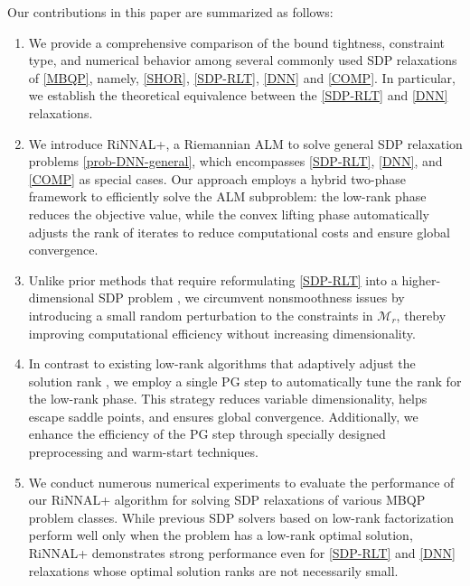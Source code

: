 \documentclass[11pt]{article}
\theoremstyle{plain}
\def\M{\mathcal{M}}
\begin{document}
Our contributions in this paper are summarized as follows:
\begin{enumerate}
    \item We provide a comprehensive comparison of the bound tightness, constraint type, and numerical behavior among several commonly used SDP relaxations of \eqref{MBQP}, namely, \eqref{SHOR}, \eqref{SDP-RLT}, \eqref{DNN} and \eqref{COMP}. In particular, we establish the theoretical equivalence between the \eqref{SDP-RLT} and \eqref{DNN} relaxations.
    \item We introduce RiNNAL+,  a Riemannian ALM to solve general SDP relaxation problems \eqref{prob-DNN-general}, which encompasses \eqref{SDP-RLT}, \eqref{DNN}, and \eqref{COMP} as special cases. 
    Our approach employs a hybrid two-phase framework to efficiently solve the ALM subproblem: the low-rank phase reduces the objective value, while the convex lifting phase automatically adjusts the rank of iterates to reduce computational costs and ensure global convergence.
    \item Unlike prior methods that require reformulating \eqref{SDP-RLT} into a higher-dimensional SDP problem \cite{RiNNAL}, we circumvent nonsmoothness issues by introducing a small random perturbation to the constraints in $\M_r$, thereby improving computational efficiency without increasing dimensionality.
    \item In contrast to existing low-rank algorithms that adaptively adjust the solution rank \cite{wang2023decomposition, wang2023solving, tang2024feasible,RiNNAL}, we employ a single PG step to automatically tune the rank for the low-rank phase. This strategy reduces variable dimensionality, helps escape saddle points, and ensures global convergence. Additionally, we enhance the efficiency of the PG step through specially designed preprocessing and warm-start techniques.
    \item We conduct numerous numerical experiments to evaluate the performance of our RiNNAL+ algorithm for solving SDP relaxations of various MBQP problem classes. While previous SDP solvers based on low-rank factorization perform well only when the problem has a low-rank optimal solution, RiNNAL+ demonstrates strong performance even for \eqref{SDP-RLT} and \eqref{DNN} relaxations whose optimal solution ranks are not necessarily small.
\end{enumerate}



\end{document}
